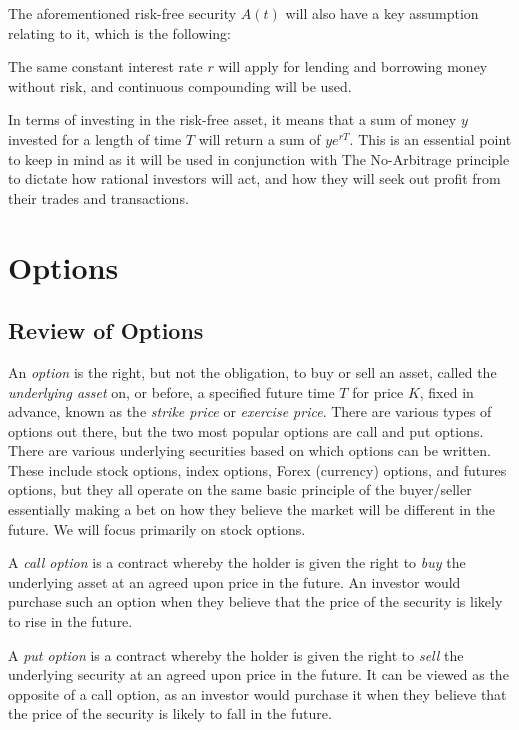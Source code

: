 \documentclass[letterpaper,12pt]{article}
\theoremstyle{plain}
\numberwithin{equation}{section}
\begin{document}
The aforementioned risk-free security $A(t)$ will also have a key assumption relating to it, which is the following:

\begin{assumption}
The same constant interest rate $r$ will apply for lending and borrowing money without risk, and continuous compounding will be used.
\end{assumption}

In terms of investing in the risk-free asset, it means that a sum of money $y$ invested for a length of time $T$ will return a sum of $ye^{rT}$. This is an essential point to keep in mind as it will be used in conjunction with The No-Arbitrage principle to dictate how rational investors will act, and how they will seek out profit from their trades and transactions.


\section{Options}

\subsection{Review of Options}

An {\em option} is the right, but not the obligation, to buy or sell an asset, called the {\em underlying asset} on, or before, a specified future time $T$ for price $K$, fixed in advance, known as the {\em strike price} or {\em exercise price}. There are various types of options out there, but the two most popular options are call and put options. There are various underlying securities based on which options can be written. These include stock options, index options, Forex (currency) options, and futures options, but they all operate on the same basic principle of the buyer/seller essentially making a bet on how they believe the market will be different in the future. We will focus primarily on stock options.

A {\em call option} is a contract whereby the holder is given the right to {\em buy} the underlying asset at an agreed upon price in the future. An investor would purchase such an option when they believe that the price of the security is likely to rise in the future.

A {\em put option} is a contract whereby the holder is given the right to {\em sell} the underlying security at an agreed upon price in the future. It can be viewed as the opposite of a call option, as an investor would purchase it when they believe that the price of the security is likely to fall in the future.
\end{document}
